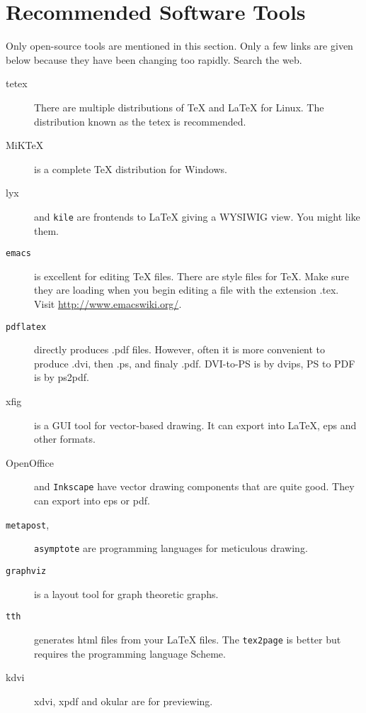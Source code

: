 \chapter{Recommended Software Tools}

Only open-source tools are mentioned in this section.  Only a few
links are given below because they have been changing too rapidly.
Search the web.

\begin{description}
\item[tetex]There are multiple distributions of TeX and LaTeX for
  Linux.  The distribution known as the tetex is recommended.
\item[MiKTeX] is a complete \TeX{} distribution for Windows.
\item[lyx] and {\tt kile} are frontends to \LaTeX{} giving a WYSIWIG
  view.  You might like them.

\item[{\tt emacs}] is excellent for editing TeX files.  There are
  style files for TeX.  Make sure they are loading when you begin
  editing a file with the extension .tex.  Visit
  \url{http://www.emacswiki.org/}.

\item[{\tt pdflatex}]
directly produces .pdf files.  However, often it is more
convenient to produce .dvi, then .ps, and finaly .pdf.  DVI-to-PS is
by dvips, PS to PDF is by ps2pdf.

\item[xfig] is a GUI tool for vector-based drawing.  It can export
  into \LaTeX{}, eps and other formats.

\item [OpenOffice] and {\tt Inkscape} have vector drawing components
  that are quite good.  They can export into eps or pdf.

\item [{\tt metapost},] {\tt asymptote} are programming languages for
meticulous drawing.

\item[{\tt graphviz}] is a layout tool for graph theoretic graphs.

\item[{\tt tth}] generates {\sc html} files from your LaTeX files.
  The {\tt tex2page} is better but requires the programming language
  Scheme.

\item[kdvi]  xdvi, xpdf and okular are for previewing.

\end{description}

